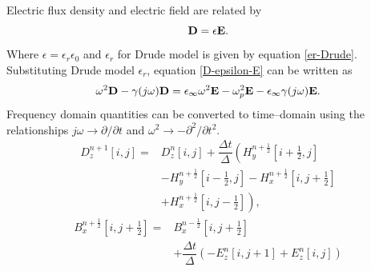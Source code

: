 \documentclass[portrait,final,a1paper,fontscale=0.4]{baposter}
\begin{document}
\begin{poster}
{\begin{minipage}{\linewidth}
  \end{minipage}
  }
  {
Electric flux density and electric field are related by
\vspace{-0.1cm}
\begin{equation}
\centering
\textbf{D} = \epsilon \textbf{E}.
\label{D-epsilon-E}
\end{equation}
\vspace{-0.1cm}
Where $\epsilon = \epsilon_r\epsilon_0$ and $\epsilon_r$ for Drude model is given by equation \ref{er-Drude}. Substituting Drude model $\epsilon_r$, equation \ref{D-epsilon-E} can be written as
\vspace{-0.1cm}
\begin{equation}
\centering
\omega^2\textbf{D}-\gamma(j\omega)\textbf{D} = \epsilon_\infty\omega^2\textbf{E}-\omega^2_p\textbf{E}-\epsilon_\infty \gamma(j\omega)\textbf{E}.
\label{D-epsilonomega-E-frequency-domain}
\end{equation}
Frequency domain quantities can be converted to time--domain using the relationships $j\omega \rightarrow \partial/\partial t$ and $\omega^2 \rightarrow - \partial^2/\partial t^2$. 
\begin{equation}
\begin{split}
D^{n+1}_z \left[i,j\right]=&D^{n}_z \left[i,j\right]+\dfrac{\Delta t}{\Delta}\left(H^{n+\frac{1}{2}}_y\left[i+\frac{1}{2},j\right]\right.\\
&\left.-H^{n+\frac{1}{2}}_y \left[i-\frac{1}{2},j\right]-H^{n+\frac{1}{2}}_x \left[i,j+\frac{1}{2}\right]\right.\\
&\left.+H^{n+\frac{1}{2}}_x \left[i,j-\frac{1}{2}\right]\right),
\end{split}
\label{eq:Dz-2D-FDTD-TMz}
\end{equation}
\begin{equation}
\begin{split}
B^{n+\frac{1}{2}}_x \left[i,j+\frac{1}{2}\right]=&B^{n-\frac{1}{2}}_x \left[i,j+\frac{1}{2}\right]\\& + \dfrac{\Delta t}{\Delta} \left(-E^{n}_z \left[i,j+1\right] + E^{n}_z \left[i,j\right] \right)
\end{split}

\end{equation}}
\end{poster}
\end{document}
